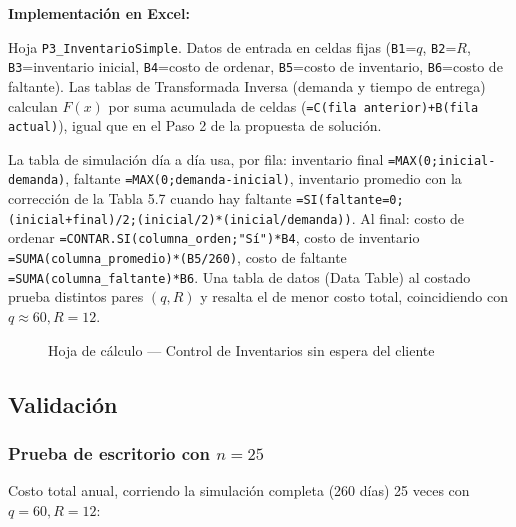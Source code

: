 \documentclass[12pt, a4paper]{article}
\begin{document}
\textbf{Implementación en Excel:}

Hoja \texttt{P3\_InventarioSimple}. Datos de entrada en celdas fijas (\texttt{B1}=$q$, \texttt{B2}=$R$, \texttt{B3}=inventario inicial, \texttt{B4}=costo de ordenar, \texttt{B5}=costo de inventario, \texttt{B6}=costo de faltante). Las tablas de Transformada Inversa (demanda y tiempo de entrega) calculan $F(x)$ por suma acumulada de celdas (\texttt{=C(fila anterior)+B(fila actual)}), igual que en el Paso 2 de la propuesta de solución.

La tabla de simulación día a día usa, por fila: inventario final \texttt{=MAX(0;inicial-demanda)}, faltante \texttt{=MAX(0;demanda-inicial)}, inventario promedio con la corrección de la Tabla 5.7 cuando hay faltante \texttt{=SI(faltante=0;(inicial+final)/2;(inicial/2)*(inicial/demanda))}. Al final: costo de ordenar \texttt{=CONTAR.SI(columna\_orden;"Sí")*B4}, costo de inventario \texttt{=SUMA(columna\_promedio)*(B5/260)}, costo de faltante \texttt{=SUMA(columna\_faltante)*B6}. Una tabla de datos (Data Table) al costado prueba distintos pares $(q,R)$ y resalta el de menor costo total, coincidiendo con $q\approx60, R=12$.

\begin{figure}[H]
\centering
{}
\caption{Hoja de cálculo — Control de Inventarios sin espera del cliente}
\end{figure}

\subsection{Validación}

\subsubsection{\texorpdfstring{Prueba de escritorio con $n=25$}{Prueba de escritorio con n=25}}

Costo total anual, corriendo la simulación completa (260 días) 25 veces con $q=60,R=12$:
\end{document}
